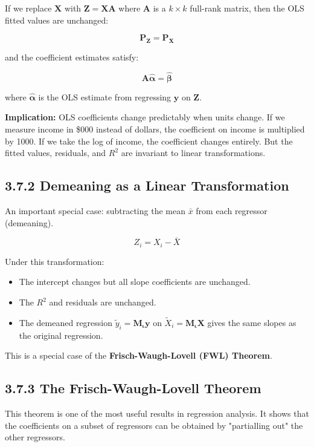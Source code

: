 If we replace $\mathbf{X}$ with $\mathbf{Z} = \mathbf{X}\mathbf{A}$ where $\mathbf{A}$ is a $k \times k$ full-rank matrix, then the OLS fitted values are unchanged:

\[
\mathbf{P_Z} = \mathbf{P_X}
\]

and the coefficient estimates satisfy:

\[
\mathbf{A}\hat{\boldsymbol{\alpha}} = \hat{\boldsymbol{\beta}}
\]

where $\hat{\boldsymbol{\alpha}}$ is the OLS estimate from regressing $\mathbf{y}$ on $\mathbf{Z}$.

\textbf{Implication:} OLS coefficients change predictably when units change. If we measure income in \$000 instead of dollars, the coefficient on income is multiplied by 1000. If we take the log of income, the coefficient changes entirely. But the fitted values, residuals, and $R^2$ are invariant to linear transformations.

\subsection{3.7.2 Demeaning as a Linear Transformation}

An important special case: subtracting the mean $\bar{x}$ from each regressor (demeaning).

\[
Z_i = X_i - \bar{X}
\]

Under this transformation:
\begin{itemize}
\item The intercept changes but all slope coefficients are unchanged.
\item The $R^2$ and residuals are unchanged.
\item The demeaned regression $\tilde{y}_i = \mathbf{M_\iota}\mathbf{y}$ on $\tilde{X}_i = \mathbf{M_\iota}\mathbf{X}$ gives the same slopes as the original regression.
\end{itemize}

This is a special case of the \textbf{Frisch-Waugh-Lovell (FWL) Theorem}.

\subsection{3.7.3 The Frisch-Waugh-Lovell Theorem}

This theorem is one of the most useful results in regression analysis. It shows that the coefficients on a subset of regressors can be obtained by "partialling out" the other regressors.

